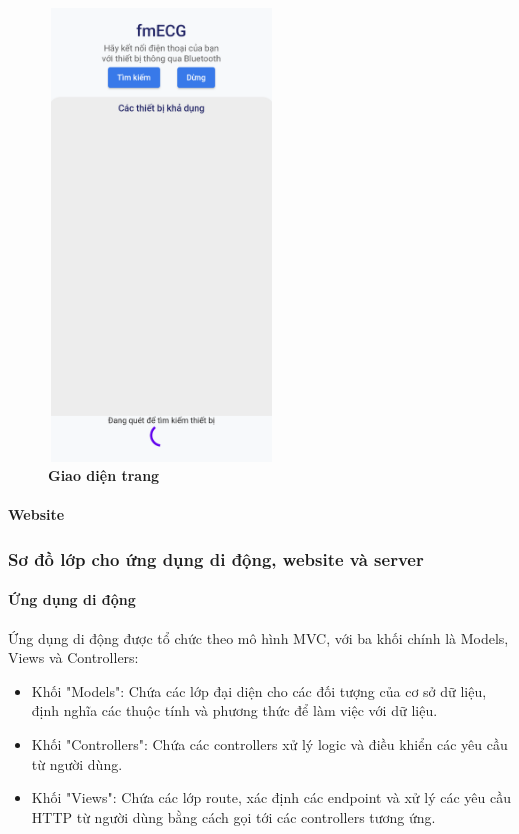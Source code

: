\begin{figure}[H]
  \centering
  \includegraphics[width=6cm,height=12cm]{Images/mobile_app/demo/finding_bluetooth.png}
  \caption[Giao diện trang]{\bfseries \fontsize{12pt}{0pt}\selectfont Giao diện trang}
  \label{demo_} %
\end{figure}



\paragraph{Website}
\mbox{}



\subsubsection{Sơ đồ lớp cho ứng dụng di động, website và server}

\paragraph{Ứng dụng di động}
\mbox{}

Ứng dụng di động được tổ chức theo mô hình MVC, với ba khối chính là Models, Views và Controllers:
  
\begin{itemize}
  \item Khối "Models": Chứa các lớp đại diện cho các đối tượng của cơ sở dữ liệu, định nghĩa các thuộc tính và phương thức để làm việc với dữ liệu.
 
  \item Khối "Controllers": Chứa các controllers xử lý logic và điều khiển các yêu cầu từ người dùng.

  \item Khối "Views": Chứa các lớp route, xác định các endpoint và xử lý các yêu cầu HTTP từ người dùng bằng cách gọi tới các controllers tương ứng.
\end{itemize}


